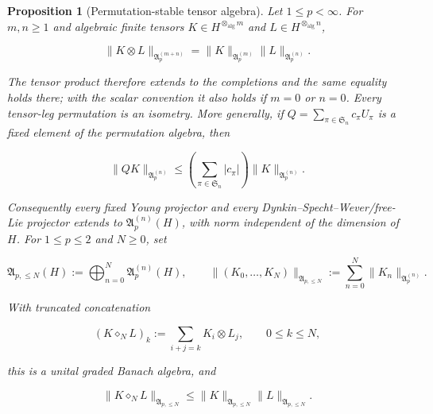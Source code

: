 \documentclass[10pt,reqno]{amsart}
\theoremstyle{plain}
\newtheorem{proposition}[theorem]{Proposition}
\theoremstyle{definition}
\theoremstyle{remark}
\begin{document}
\begin{proposition}[Permutation-stable tensor algebra]
\label{cc:gen-prop-permutation-stable-tensor-algebra}
Let \(1\leq p<\infty\).  For \(m,n\geq1\) and algebraic finite tensors
\(K\in H^{\otimes_{\mathrm{alg}}m}\) and
\(L\in H^{\otimes_{\mathrm{alg}}n}\),

\begin{equation}
 \|K\otimes L\|_{\mathfrak A_p^{(m+n)}}
 =\|K\|_{\mathfrak A_p^{(m)}}
  \|L\|_{\mathfrak A_p^{(n)}}.
 \label{cc:gen-exact-schatten-tensor-crossnorm}
\end{equation}

The tensor product therefore extends to the completions and the same equality
holds there; with the scalar convention it also holds if \(m=0\) or \(n=0\).
Every tensor-leg permutation is an isometry.  More generally,
if \(Q=\sum_{\pi\in\mathfrak S_n}c_\pi U_\pi\) is a fixed element of the
permutation algebra, then

\begin{equation}
 \|QK\|_{\mathfrak A_p^{(n)}}
 \leq\left(\sum_{\pi\in\mathfrak S_n}|c_\pi|\right)
 \|K\|_{\mathfrak A_p^{(n)}}.
 \label{cc:gen-permutation-projector-bound}
\end{equation}

Consequently every fixed Young projector and every
Dynkin--Specht--Wever/free-Lie projector extends to
\(\mathfrak A_p^{(n)}(H)\), with norm independent of the dimension of \(H\).
For \(1\leq p\leq2\) and \(N\geq0\), set

\begin{equation}
 \mathfrak A_{p,\leq N}(H)
 :=\bigoplus_{n=0}^N\mathfrak A_p^{(n)}(H),
 \qquad
 \|(K_0,\ldots,K_N)\|_{\mathfrak A_{p,\leq N}}
 :=\sum_{n=0}^N\|K_n\|_{\mathfrak A_p^{(n)}}.
 \label{cc:gen-truncated-augmented-algebra}
\end{equation}

With truncated concatenation

\begin{equation}
 (K\diamond_N L)_k:=\sum_{i+j=k}K_i\otimes L_j,
 \qquad 0\leq k\leq N,
 \label{cc:gen-truncated-concatenation}
\end{equation}

this is a unital graded Banach algebra, and

\begin{equation}
 \|K\diamond_NL\|_{\mathfrak A_{p,\leq N}}
 \leq
 \|K\|_{\mathfrak A_{p,\leq N}}
 \|L\|_{\mathfrak A_{p,\leq N}}.
 \label{cc:gen-truncated-concatenation-bound}
\end{equation}
\end{proposition}
\end{document}
